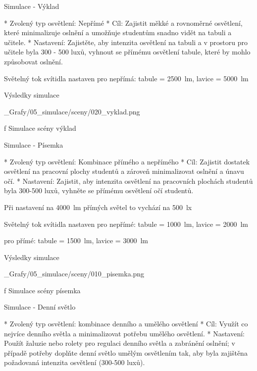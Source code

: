 


\sec Simulace - Výklad

\begitems
* Zvolený typ osvětlení: Nepřímé
* Cíl: Zajistit měkké a rovnoměrné osvětlení, které minimalizuje oslnění a umožňuje studentům snadno vidět na tabuli a učitele.
* Nastavení: Zajistěte, aby intenzita osvětlení na tabuli a v prostoru pro učitele byla 300 - 500 luxů, vyhnout se přímému osvětlení tabule, které by mohlo způsobovat oslnění.
\enditems

\noindent Světelný tok svítidla nastaven pro nepřímá: tabule = 2500~lm, lavice = 5000~lm

\secc Výsledky simulace

\medskip {}
\picw=15cm _Grafy/05_simulace/sceny/020_vyklad.png
\caption/f Simulace scény výklad
\medskip

\sec Simulace - Písemka

\begitems
* Zvolený typ osvětlení: Kombinace přímého a nepřímého
* Cíl: Zajistit dostatek osvětlení na pracovní plochy studentů a zároveň minimalizovat oslnění a únavu očí.
* Nastavení: Zajistit, aby intenzita osvětlení na pracovních plochách studentů byla 300-500 luxů, vyhněte se přímému osvětlení očí studentů.
\enditems


\noindent Při nastavení na 4000~lm přímých světel to vychází na 500~lx

\noindent Světelný tok svítidla nastaven pro nepřímé: tabule = 1000~lm, lavice = 2000~lm

pro přímé: tabule = 1500~lm, lavice = 3000~lm

\secc Výsledky simulace

\medskip {}
\picw=15cm _Grafy/05_simulace/sceny/010_pisemka.png
\caption/f Simulace scény písemka
\medskip

\sec Simulace - Denní světlo

\begitems
* Zvolený typ osvětlení: kombinace denního a umělého osvětlení
* Cíl: Využít co nejvíce denního světla a minimalizovat potřebu umělého osvětlení.
* Nastavení: Použít žaluzie nebo rolety pro regulaci denního světla a zabránění oslnění; v případě potřeby doplňte denní světlo umělým osvětlením tak, aby byla zajištěna požadovaná intenzita osvětlení (300-500 luxů).
\enditems

